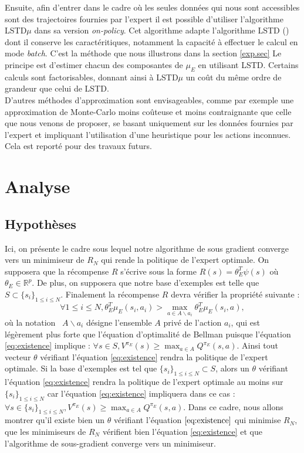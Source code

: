 \documentclass[publibook-draft]{CAp2012}
\begin{document}
Ensuite, afin d'entrer dans le cadre où les seules données qui nous sont accessibles sont des trajectoires fournies par l'expert il est possible d'utiliser l'algorithme LSTD$\mu$ \citep{klein2011batch} dans sa version \emph{on-policy}. Cet algorithme adapte l'algorithme LSTD (\cite{bradtke1996linear}) dont il conserve les caractéritiques, notamment la capacité à effectuer le calcul en mode {\it batch}. C'est la méthode que nous illustrons dans la section \ref{exp.sec} Le principe est d'estimer chacun des composantes de $\mu_E$ en utilisant LSTD. Certains calculs sont factorisables, donnant ainsi à LSTD$\mu$ un coût du même ordre de grandeur que celui de LSTD.\\

D'autres méthodes d'approximation sont envisageables, comme par exemple une approximation de Monte-Carlo moins coûteuse et moins contraignante que celle que nous venons de proposer, se basant uniquement sur les données fournies par l'expert et impliquant l'utilisation d'une heuristique pour les actions inconnues. Cela est reporté pour des travaux futurs.
\section{Analyse}\label{proof.sec}
\subsection{Hypothèses}
Ici, on présente le cadre sous lequel notre algorithme de sous gradient converge vers un minimiseur de $R_N$ qui rende la politique de l'expert optimale. On supposera que la récompense $R$ s'écrive sous la forme $R(s)=\theta_E^T\psi(s)$ où $\theta_E\in\mathbb{R}^p$. De plus, on supposera que notre base d'exemples est telle que $S\subset \{s_i\}_{1\leq i \leq N}$. Finalement la récompense $R$ devra vérifier la propriété suivante :
\begin{equation}\label{eq:existence}
\forall 1\leq i \leq N, \theta_E^T\mu_E(s_i,a_i)>\max_{a\in A \backslash a_i}\theta_E^T\mu_E(s_i,a),
\end{equation}
où la notation ~$A \backslash a_i$ désigne l'ensemble $A$ privé de l'action $a_i$, qui est légèrement plus forte que l'équation d'optimalité de Bellman puisque l'équation \eqref{eq:existence} implique : $\forall s\in S, V^{\pi_E}(s)\geq\max_{a\in A}Q^{\pi_E}(s,a)$. Ainsi tout vecteur $\theta$ vérifiant l'équation \eqref{eq:existence} rendra la politique de l'expert optimale. Si la base d'exemples est tel que $\{s_i\}_{1\leq i \leq N}\subset S$, alors un $\theta$ vérifiant l'équation \eqref{eq:existence} rendra la politique de l'expert optimale au moins sur $\{s_i\}_{1\leq i \leq N}$ car l'équation \eqref{eq:existence} impliquera dans ce cas :$\forall s\in \{s_i\}_{1\leq i \leq N}, V^{\pi_E}(s)\geq\max_{a\in A}Q^{\pi_E}(s,a)$.
Dans ce cadre, nous allons montrer qu'il existe bien un $\theta$ vérifiant l'équation $\eqref{eq:existence}$ qui minimise $R_N$,  que les minimiseurs de $R_N$ vérifient bien l'équation \eqref{eq:existence} et que l'algorithme de sous-gradient converge vers un minimiseur.
\end{document}
